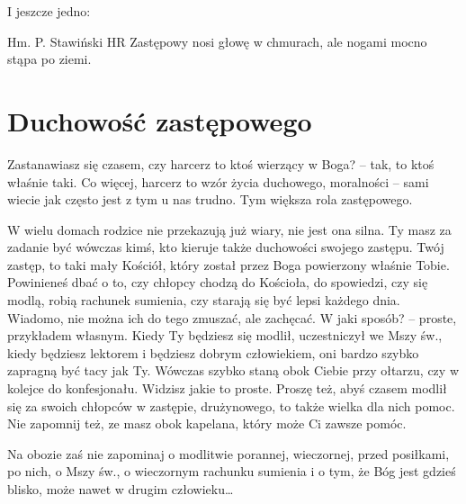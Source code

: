 I jeszcze jedno:
\begin{aquote}{Hm. P. Stawiński HR}
Zastępowy  nosi  głowę  w chmurach, ale  nogami  mocno  stąpa  po  ziemi.
 \end{aquote}



\section{Duchowość zastępowego}

Zastanawiasz się czasem, czy harcerz to ktoś wierzący w Boga? – tak, to ktoś właśnie taki. Co więcej, harcerz to wzór życia duchowego, moralności – sami wiecie jak często jest z tym u nas trudno. Tym większa rola zastępowego.

W wielu domach rodzice nie przekazują już wiary, nie jest ona silna. Ty masz za zadanie być wówczas kimś, kto kieruje także duchowości swojego zastępu. Twój zastęp, to taki mały Kościół, który został przez Boga powierzony właśnie Tobie. Powinieneś dbać o to, czy chłopcy chodzą do Kościoła, do spowiedzi, czy się modlą, robią rachunek sumienia, czy starają się być lepsi każdego dnia. Wiadomo, nie można ich do tego zmuszać, ale zachęcać. W jaki sposób? – proste, przykładem własnym. Kiedy Ty będziesz się modlił, uczestniczył we Mszy św., kiedy będziesz lektorem i będziesz dobrym człowiekiem, oni bardzo szybko zapragną być tacy jak Ty. Wówczas szybko staną obok Ciebie przy ołtarzu, czy w kolejce do konfesjonału. Widzisz jakie to proste. Proszę też, abyś czasem modlił się za swoich chłopców w zastępie, drużynowego, to także wielka dla nich pomoc. Nie zapomnij też, ze masz obok kapelana, który może Ci zawsze pomóc.

Na obozie zaś nie zapominaj o modlitwie porannej, wieczornej, przed posiłkami, po nich, o Mszy św., o wieczornym rachunku sumienia i o tym, że Bóg jest gdzieś blisko, może nawet w drugim człowieku\ldots